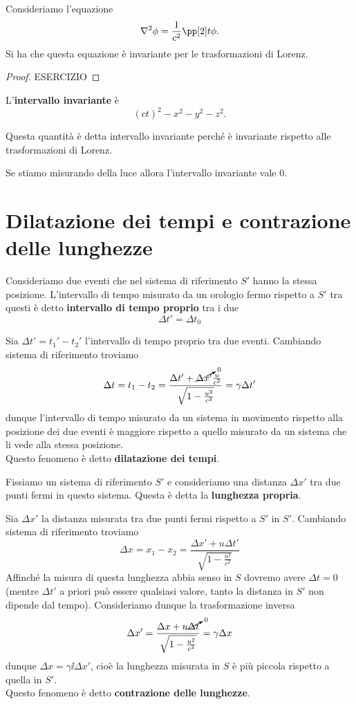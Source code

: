 \begin{example}
Consideriamo l'equazione
\[\nabla^2\phi=\frac1{c^2}\pp[2]t\phi.\]
Si ha che questa equazione \`e invariante per le trasformazioni di Lorenz.
\end{example}
\begin{proof}
ESERCIZIO
\end{proof}


\begin{definition}
L'\textbf{intervallo invariante} \`e
\[(ct)^2-x^2-y^2-z^2.\]
\end{definition}
\noindent Questa quantit\`a \`e detta intervallo invariante perch\'e \`e invariante rispetto alle trasformazioni di Lorenz.

\begin{remark}
Se stiamo misurando della luce allora l'intervallo invariante vale $0$.
\end{remark}


\section{Dilatazione dei tempi e contrazione delle lunghezze}
\begin{definition}
Consideriamo due eventi che nel sistema di riferimento $S'$ hanno la stessa posizione. L'intervallo di tempo misurato da un orologio fermo rispetto a $S'$ tra questi \`e detto \textbf{intervallo di tempo proprio} tra i due
\[\Delta t'=\Delta t_0\]
\end{definition}

\noindent
Sia $\Delta t'=t_1'-t_2'$ l'intervallo di tempo proprio tra due eventi. Cambiando sistema di riferimento troviamo
\[\Delta t=t_1-t_2=\frac{\Delta t'+\cancelto0{\Delta x'} \frac{u}{c^2}}{\sqrt{1-\frac {u^2}{c^2}}}=\gamma \Delta t'\]
dunque l'intervallo di tempo misurato da un sistema in movimento rispetto alla posizione dei due eventi \`e maggiore rispetto a quello misurato da un sistema che li vede alla stessa posizione.\\
Questo fenomeno \`e detto \textbf{dilatazione dei tempi}.
\bigskip


\begin{definition}
Fissiamo un sistema di riferimento $S'$ e consideriamo una distanza $\Delta x'$ tra due punti fermi in questo sistema. Questa \`e detta la \textbf{lunghezza propria}.
\end{definition}
Sia $\Delta x'$ la distanza misurata tra due punti fermi rispetto a $S'$ in $S'$. Cambiando sistema di riferimento troviamo
\[\Delta x=x_1-x_2=\frac{\Delta x'+u\Delta t'}{\sqrt{1-\frac{u^2}{c^2}}}\]
Affinch\'e la misura di questa lunghezza abbia senso in $S$ dovremo avere $\Delta t=0$ (mentre $\Delta t'$ a priori pu\`o essere qualsiasi valore, tanto la distanza in $S'$ non dipende dal tempo). Consideriamo dunque la trasformazione inversa
\[\Delta x'=\frac{\Delta x+u\cancelto0{\Delta t}}{\sqrt{1-\frac{u^2}{c^2}}}=\gamma \Delta x\]
dunque $\Delta x=\gamma\ii \Delta x'$, cio\`e la lunghezza misurata in $S$ \`e pi\`u piccola rispetto a quella in $S'$.\\
Questo fenomeno \`e detto \textbf{contrazione delle lunghezze}.

